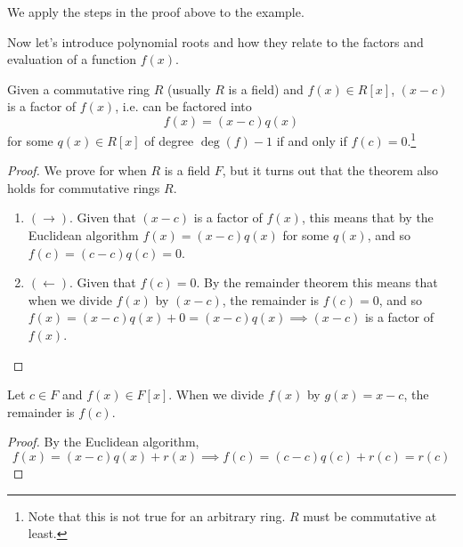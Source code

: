   \begin{example} 
    We apply the steps in the proof above to the example. 
    
    \begin{center}
    \end{center}
  \end{example} 

  Now let's introduce polynomial roots and how they relate to the factors and evaluation of a function $f(x)$. 

  \begin{corollary}
    Given a commutative ring $R$ (usually $R$ is a field) and $f(x) \in R[x]$, $(x - c)$ is a factor of $f(x)$, i.e. can be factored into 
    \begin{equation}
      f(x) = (x - c) q(x) 
    \end{equation}
    for some $q(x) \in R[x]$ of degree $\deg(f) - 1$ if and only if $f(c) = 0$.\footnote{Note that this is not true for an arbitrary ring. $R$ must be commutative at least.}
  \end{corollary} 
  \begin{proof}
    We prove for when $R$ is a field $F$, but it turns out that the theorem also holds for commutative rings $R$. 
    \begin{enumerate}
      \item $(\rightarrow)$. Given that $(x - c)$ is a factor of $f(x)$, this means that by the Euclidean algorithm $f(x) = (x - c) q(x)$ for some $q(x)$, and so $f(c) = (c - c) q(c) = 0$. 
      \item $(\leftarrow)$. Given that $f(c) = 0$. By the remainder theorem this means that when we divide $f(x)$ by $(x - c)$, the remainder is $f(c) = 0$, and so $f(x) = (x - c) q(x) + 0 = (x - c) q(x) \implies (x - c)$ is a factor of $f(x)$. 
    \end{enumerate}
  \end{proof}

  \begin{corollary}
    Let $c \in F$ and $f(x) \in F[x]$. When we divide $f(x)$ by $g(x) = x - c$, the remainder is $f(c)$. 
  \end{corollary}
  \begin{proof}
    By the Euclidean algorithm, 
    \begin{equation}
      f(x) = (x - c) q(x) + r(x) \implies f(c) = (c - c) q(c) + r(c) = r(c)
    \end{equation}
  \end{proof} 

